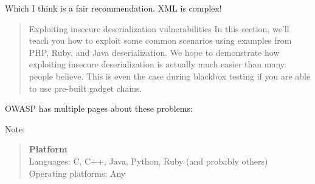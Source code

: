 \documentclass[Screen16to9,17pt]{foils}
\begin{document}
Which I think is a fair recommendation. XML is complex!



\begin{quote}
Exploiting insecure deserialization vulnerabilities
In this section, we'll teach you how to exploit some common scenarios using examples from PHP, Ruby, and Java deserialization. We hope to demonstrate how exploiting insecure deserialization is actually much easier than many people believe. This is even the case during blackbox testing if you are able to use pre-built gadget chains.
\end{quote}



\begin{list2}
    \item OWASP has multiple pages about these problems:\\
\item Note:
\begin{quote}{\bf
Platform}\\
Languages: C, C++, Java, Python, Ruby (and probably others)\\
Operating platforms: Any
\end{quote}
\end{list2}





\slidenext{}
\end{document}

